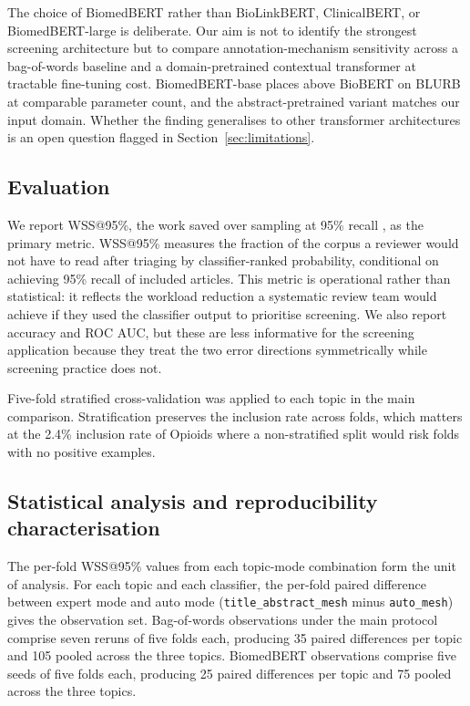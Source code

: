 \documentclass{article}
\begin{document}
The choice of BiomedBERT rather than BioLinkBERT, ClinicalBERT, or BiomedBERT-large is deliberate. Our aim is not to identify the strongest screening architecture but to compare annotation-mechanism sensitivity across a bag-of-words baseline and a domain-pretrained contextual transformer at tractable fine-tuning cost. BiomedBERT-base places above BioBERT on BLURB \cite{gu2021biomedbert} at comparable parameter count, and the abstract-pretrained variant matches our input domain. Whether the finding generalises to other transformer architectures is an open question flagged in Section~\ref{sec:limitations}.

\subsection{Evaluation}

We report WSS@95\%, the work saved over sampling at 95\% recall \cite{cohen2006drug}, as the primary metric. WSS@95\% measures the fraction of the corpus a reviewer would not have to read after triaging by classifier-ranked probability, conditional on achieving 95\% recall of included articles. This metric is operational rather than statistical: it reflects the workload reduction a systematic review team would achieve if they used the classifier output to prioritise screening. We also report accuracy and ROC AUC, but these are less informative for the screening application because they treat the two error directions symmetrically while screening practice does not.

Five-fold stratified cross-validation was applied to each topic in the main comparison. Stratification preserves the inclusion rate across folds, which matters at the 2.4\% inclusion rate of Opioids where a non-stratified split would risk folds with no positive examples.

\subsection{Statistical analysis and reproducibility characterisation}\label{sec:stats}

The per-fold WSS@95\% values from each topic-mode combination form the unit of analysis. For each topic and each classifier, the per-fold paired difference between expert mode and auto mode (\texttt{title\_abstract\_mesh} minus \texttt{auto\_mesh}) gives the observation set. Bag-of-words observations under the main protocol comprise seven reruns of five folds each, producing 35 paired differences per topic and 105 pooled across the three topics. BiomedBERT observations comprise five seeds of five folds each, producing 25 paired differences per topic and 75 pooled across the three topics.
\end{document}
